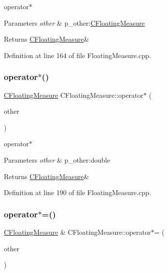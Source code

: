 operator$\ast$ 


\begin{DoxyParams}{Parameters}
{\em other} & p\+\_\+other\+:\hyperlink{classCFloatingMeasure}{C\+Floating\+Measure} \\
\hline
\end{DoxyParams}
\begin{DoxyReturn}{Returns}
\hyperlink{classCFloatingMeasure}{C\+Floating\+Measure}\& 
\end{DoxyReturn}


Definition at line 164 of file Floating\+Measure.\+cpp.

\mbox{\label{classCFloatingMeasure_a31cedd2120675c56064e12556432f550}} 
\subsubsection{\texorpdfstring{operator$\ast$()}{operator*()}\hspace{0.1cm}{\footnotesize\ttfamily [2/2]}}
{\footnotesize\ttfamily \hyperlink{classCFloatingMeasure}{C\+Floating\+Measure} C\+Floating\+Measure\+::operator$\ast$ (\begin{DoxyParamCaption}\item[{const double \&}]{other }\end{DoxyParamCaption})}



operator$\ast$ 


\begin{DoxyParams}{Parameters}
{\em other} & p\+\_\+other\+:double \\
\hline
\end{DoxyParams}
\begin{DoxyReturn}{Returns}
\hyperlink{classCFloatingMeasure}{C\+Floating\+Measure}\& 
\end{DoxyReturn}


Definition at line 190 of file Floating\+Measure.\+cpp.

\mbox{\label{classCFloatingMeasure_a2df7738d5c017a02c1f11c40809cac96}} 
\subsubsection{\texorpdfstring{operator$\ast$=()}{operator*=()}\hspace{0.1cm}{\footnotesize\ttfamily [1/2]}}
{\footnotesize\ttfamily \hyperlink{classCFloatingMeasure}{C\+Floating\+Measure} \& C\+Floating\+Measure\+::operator$\ast$= (\begin{DoxyParamCaption}\item[{const \hyperlink{classCFloatingMeasure}{C\+Floating\+Measure} \&}]{other }\end{DoxyParamCaption})}



